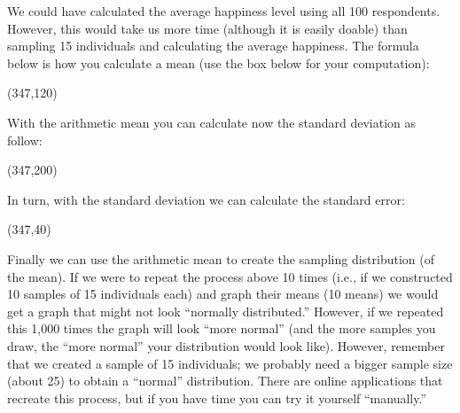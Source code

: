 \documentclass{article}
\begin{document}
We could have calculated the average happiness level using all 100 respondents. However, this would take us more time (although it is easily doable) than sampling 15 individuals and calculating the average happiness. The formula below is how you calculate a mean (use the box below for your computation):

\begin{center}
\end{center}

\framebox(347,120){} 

With the arithmetic mean you can calculate now the standard deviation as follow:

\begin{center}
\end{center}

\framebox(347,200){} 

In turn, with the standard deviation we can calculate the standard error:

\begin{center}
\end{center}

\framebox(347,40){} 

Finally we can use the arithmetic mean to create the sampling distribution (of the mean). If we were to repeat the process above 10 times (i.e., if we constructed 10 samples of 15 individuals each) and graph their means (10 means) we would get a graph that might not look ``normally distributed.'' However, if we repeated this 1,000 times the graph will look ``more normal'' (and the more samples you draw, the ``more normal'' your distribution would look like). However, remember that we created a sample of 15 individuals; we probably need a bigger sample size (about 25) to obtain a ``normal'' distribution. There are online applications that recreate this process, but if you have time you can try it yourself ``manually.''
\end{document}
